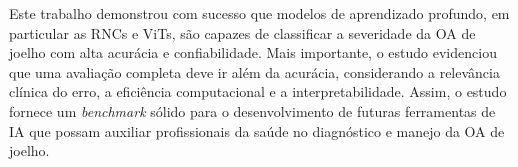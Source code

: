 Este trabalho demonstrou com sucesso que modelos de aprendizado profundo, em particular as RNCs e ViTs, são capazes de classificar a severidade da OA de joelho com alta acurácia e confiabilidade. Mais importante, o estudo evidenciou que uma avaliação completa deve ir além da acurácia, considerando a relevância clínica do erro, a eficiência computacional e a interpretabilidade. Assim, o estudo fornece um \textit{benchmark} sólido para o desenvolvimento de futuras ferramentas de IA que possam auxiliar profissionais da saúde no diagnóstico e manejo da OA de joelho.